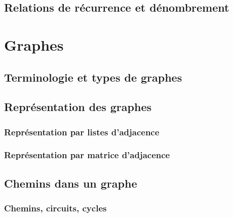 \documentclass[
  letterpaper,
]{scrbook}
\theoremstyle{plain}
\theoremstyle{definition}
\theoremstyle{definition}
\theoremstyle{remark}
\begin{document}
\hypertarget{relations-de-ruxe9currence-et-duxe9nombrement}{%
\section{Relations de récurrence et
dénombrement}\label{relations-de-ruxe9currence-et-duxe9nombrement}}


\hypertarget{graphes}{%
\chapter{Graphes}\label{graphes}}

\hypertarget{terminologie-et-types-de-graphes}{%
\section{Terminologie et types de
graphes}\label{terminologie-et-types-de-graphes}}

\hypertarget{repruxe9sentation-des-graphes}{%
\section{Représentation des
graphes}\label{repruxe9sentation-des-graphes}}

\hypertarget{repruxe9sentation-par-listes-dadjacence}{%
\subsection{Représentation par listes
d'adjacence}\label{repruxe9sentation-par-listes-dadjacence}}

\hypertarget{repruxe9sentation-par-matrice-dadjacence}{%
\subsection{Représentation par matrice
d'adjacence}\label{repruxe9sentation-par-matrice-dadjacence}}

\hypertarget{chemins-dans-un-graphe}{%
\section{Chemins dans un graphe}\label{chemins-dans-un-graphe}}

\hypertarget{chemins-circuits-cycles}{%
\subsection{Chemins, circuits, cycles}\label{chemins-circuits-cycles}}
\end{document}
